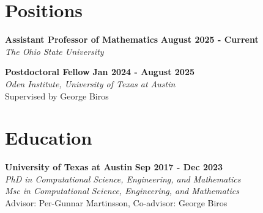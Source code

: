 \documentclass[10pt,margin]{res}
\begin{document}


\address{Email: yesypenko.1@osu.edu \quad Website:
\url{annayesy.github.io}}


\begin{resume}


\section{Positions}

\textbf{Assistant Professor of Mathematics} \hfill{\textbf{August 2025 - Current}}\\
{\sl The Ohio State University}

\textbf{Postdoctoral Fellow} \hfill{\textbf{Jan 2024 - August 2025}}\\
{\sl Oden Institute, University of Texas at Austin}\\
Supervised by George Biros


\section{Education}
\textbf{University of Texas at Austin} \hfill{\textbf{Sep 2017 - Dec 2023}}\\
{\sl PhD in Computational Science, Engineering, and Mathematics}\\
{\sl Msc in Computational Science, Engineering, and Mathematics}\\
Advisor: Per-Gunnar Martinsson, Co-advisor: George Biros


\end{resume}
\end{document}
